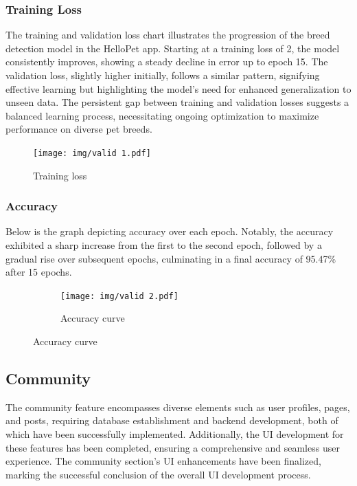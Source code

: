\newpage
\subsubsection{Training Loss}
The training and validation loss chart illustrates the progression of the breed detection model in the HelloPet app. Starting at a training loss of 2, the model consistently improves, showing a steady decline in error up to epoch 15. The validation loss, slightly higher initially, follows a similar pattern, signifying effective learning but highlighting the model's need for enhanced generalization to unseen data. The persistent gap between training and validation losses suggests a balanced learning process, necessitating ongoing optimization to maximize performance on diverse pet breeds.
\vspace{1cm}
\begin{figure}[H]
\centering
\texttt{[image: img/valid 1.pdf]}
\caption{Training loss}
\label{fig:system-overview}
\end{figure}

\newpage

\subsubsection{Accuracy}
Below is the graph depicting accuracy over each epoch. Notably, the accuracy exhibited a sharp increase from the first to the second epoch, followed by a gradual rise over subsequent epochs, culminating in a final accuracy of 95.47\% after 15 epochs.
\vspace{1cm}
\begin{figure}[H]
\centering
\vspace{0.7cm}
\begin{figure}[H]
\centering
\texttt{[image: img/valid 2.pdf]}
\caption{Accuracy curve}
\label{fig:system-overview}
\end{figure}
\newpage
\label{fig:system-overview}
\end{figure}
\newpage
\subsection{Community}
The community feature encompasses diverse elements such as user profiles, pages, and posts, requiring database establishment and backend development, both of which have been successfully implemented. Additionally, the UI development for these features has been completed, ensuring a comprehensive and seamless user experience. The community section's UI enhancements have been finalized, marking the successful conclusion of the overall UI development process.

